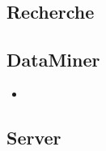\subsection*{Recherche}



\subsection*{DataMiner}

\begin{itemize}
  \item {}\:
\end{itemize}

\subsection*{Server}
